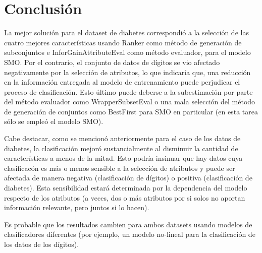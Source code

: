 \section{Conclusi\'on}\label{sec6}
La mejor soluci\'on para el dataset de diabetes correspondi\'o a la selecci\'on de las cuatro mejores caracter\'isticas usando Ranker como m\'etodo de generaci\'on de subconjuntos e InforGainAttributeEval como m\'etodo evaluador, para el modelo SMO. Por el contrario, el conjunto de datos de d\'igitos se vio afectado negativamente por la selecci\'on de atributos, lo que indicar\'ia que, una reducci\'on en la informaci\'on entregada al modelo de entrenamiento puede perjudicar el proceso de clasificaci\'on. Esto \'ultimo puede deberse a la subestimaci\'on por parte del m\'etodo evaluador como WrapperSubsetEval o una mala selecci\'on del m\'etodo de generaci\'on de conjuntos como BestFirst para SMO en particular (en esta tarea s\'olo se emple\'o el modelo SMO).
\bigskip

Cabe destacar, como se mencion\'o anteriormente para el caso de los datos de diabetes, la clasificaci\'on mejor\'o sustancialmente al disminuir la cantidad de caracter\'isticas a menos de la mitad. Esto podr\'ia insinuar que hay datos cuya clasificac\'on es m\'as o menos sensible a la selecci\'on de atributos y puede ser afectada de manera negativa (clasificaci\'on de d\'igitos) o positiva (clasificaci\'on de diabetes). Esta sensibilidad estar\'a determinada por la dependencia del modelo respecto de los atributos (a veces, dos o m\'as atributos por si solos no aportan informaci\'on relevante, pero juntos si lo hacen).

Es probable que los resultados cambien para ambos datasets usando modelos de clasificadores diferentes (por ejemplo, un modelo no-lineal para la clasificaci\'on de los datos de los d\'igitos).